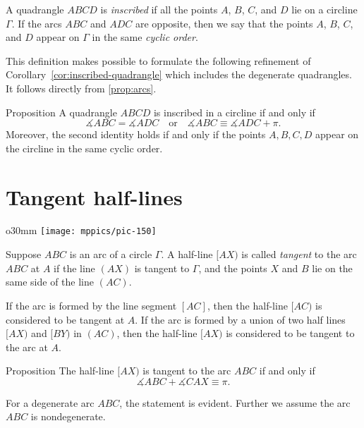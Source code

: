 A quadrangle $ABCD$ is 
\emph{inscribed}
if all the points $A$, $B$, $C$, and $D$ lie on a circline $\Gamma$.
If the arcs $ABC$ and $ADC$ are opposite, then we say that the points $A$, $B$, $C$, and $D$ appear on $\Gamma$ in the same \emph{cyclic order}.

This definition makes possible to formulate the following refinement of Corollary~\ref{cor:inscribed-quadrangle} which includes the degenerate quadrangles.
It follows directly from \ref{prop:arcs}.

\begin{thm}{Proposition}\label{prop:inscribed-quadrangle}
A quadrangle $ABCD$ is inscribed in a circline if and only if 
\[\measuredangle ABC=\measuredangle ADC\quad\text{or}\quad \measuredangle ABC\equiv\measuredangle ADC+\pi.\]
Moreover, the second identity holds if and only if the points $A,B,C,D$ appear on the circline in the same cyclic order.
\end{thm}


\section*{Tangent half-lines}

\begin{wrapfigure}{o}{30mm}
\centering
\texttt{[image: mppics/pic-150]}
\end{wrapfigure}

Suppose $ABC$ is an arc of a circle $\Gamma$.
A half-line $[AX)$ is called 
\emph{tangent} 
to the arc $ABC$ at $A$
if the line $(AX)$ is tangent to $\Gamma$, and the points $X$ and $B$ lie on the same side of the line $(AC)$.

If the arc is formed by the line segment $[AC]$, then the half-line $[AC)$ is considered to be tangent at $A$.
If the arc is formed by a union of two half lines $[AX)$ and $[BY)$ in $(AC)$,
then the half-line $[AX)$ is considered to be tangent to the arc at $A$.

\begin{thm}{Proposition}\label{prop:arc(angle=tan)}
The half-line $[AX)$ is tangent to the arc $ABC$ if and only if 
$$\measuredangle ABC+\measuredangle CAX\equiv \pi.$$

\end{thm}

For a degenerate arc $ABC$, 
the statement is evident.
Further we assume the arc $ABC$ is nondegenerate.

